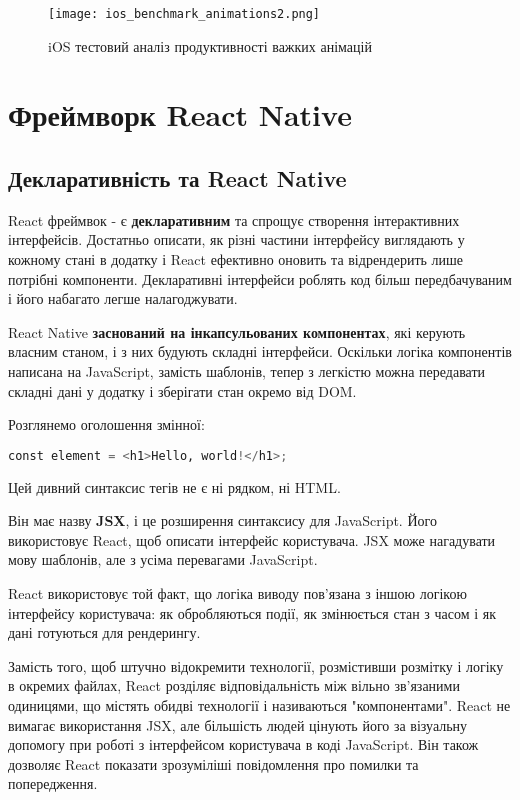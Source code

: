 \begin{figure}
    \texttt{[image: ios\_benchmark\_animations2.png]}
    \caption{iOS тестовий аналіз продуктивності важких анімацій}
    \label{fig:ios_benchmark_animations2}
\end{figure}


\section{Фреймворк React Native}
\label{sec:rn}

\subsection{Декларативність та React Native}
\label{subsec:rn_declarative}

React фреймвок - є \textbf{декларативним} та спрощує створення інтерактивних інтерфейсів.
Достатньо описати, як різні частини інтерфейсу виглядають у кожному стані в додатку і React ефективно оновить та відрендерить лише потрібні компоненти.
Декларативні інтерфейси роблять код більш передбачуваним і його набагато легше налагоджувати.

React Native \textbf{заснований на інкапсульованих компонентах}, які керують власним станом, і з них будують складні інтерфейси.
Оскільки логіка компонентів написана на JavaScript, замість шаблонів,
тепер з легкістю можна передавати складні дані у додатку і зберігати стан окремо від DOM.

Розглянемо оголошення змінної:
\begin{lstlisting}[style=light, language=Python,label={lst:jsx_hello},caption=JSX Hello World]
const element = <h1>Hello, world!</h1>;
\end{lstlisting}

Цей дивний синтаксис тегів не є ні рядком, ні HTML.

Він має назву \textbf{JSX}, і це розширення синтаксису для JavaScript.
Його використовує React, щоб описати інтерфейс користувача.
JSX може нагадувати мову шаблонів, але з усіма перевагами JavaScript.

React використовує той факт, що логіка виводу пов’язана з іншою логікою інтерфейсу користувача: як обробляються події, як змінюється стан з часом і як дані готуються для рендерингу.

Замість того, щоб штучно відокремити технології, розмістивши розмітку і логіку в окремих файлах, React розділяє відповідальність між вільно зв’язаними одиницями, що містять обидві технології і називаються "компонентами".
React не вимагає використання JSX, але більшість людей цінують його за візуальну допомогу при роботі з інтерфейсом користувача в коді JavaScript.
Він також дозволяє React показати зрозуміліші повідомлення про помилки та попередження.


